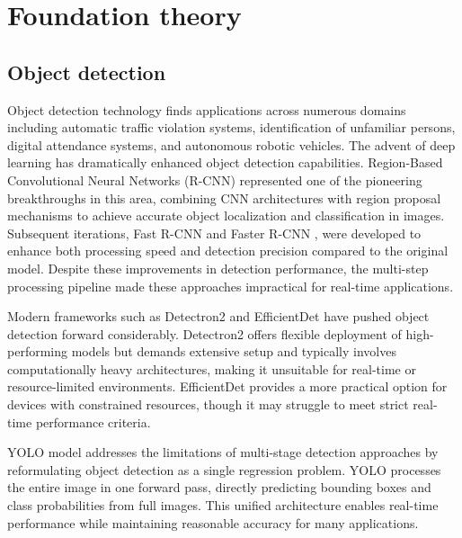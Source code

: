 \documentclass[../main.tex]{subfiles}
\begin{document}
\section{Foundation theory}
\label{sec:foundtheo}

\subsection{Object detection}
\label{sec:objdect}

Object detection technology finds applications across numerous domains including automatic traffic violation systems, identification of unfamiliar persons, digital attendance systems, and autonomous robotic vehicles. The advent of deep learning has dramatically enhanced object detection capabilities. Region-Based Convolutional Neural Networks (R-CNN) \cite{girshick2014richfeaturehierarchiesaccurate} represented one of the pioneering breakthroughs in this area, combining CNN architectures \cite{oshea2015introductionconvolutionalneuralnetworks} with region proposal mechanisms to achieve accurate object localization and classification in images. Subsequent iterations, Fast R-CNN \cite{girshick2015fastrcnn} and Faster R-CNN \cite{ren2016fasterrcnnrealtimeobject}, were developed to enhance both processing speed and detection precision compared to the original model. Despite these improvements in detection performance, the multi-step processing pipeline made these approaches impractical for real-time applications.

Modern frameworks such as Detectron2 \cite{Merz_2023} and EfficientDet \cite{tan2020efficientdetscalableefficientobject} have pushed object detection forward considerably. Detectron2 offers flexible deployment of high-performing models but demands extensive setup and typically involves \\computationally heavy architectures, making it unsuitable for real-time or resource-limited environments. EfficientDet provides a more practical option for devices with constrained resources, though it may struggle to meet strict real-time performance criteria.

YOLO model addresses the limitations of multi-stage detection approaches by reformulating object detection as a single regression problem. YOLO processes the entire image in one forward pass, directly predicting bounding boxes and class probabilities from full images. This unified architecture enables real-time performance while maintaining reasonable accuracy for many applications.
\end{document}
